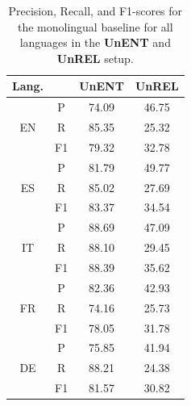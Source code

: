 \begin{table}[ht!]
\fontsize{10}{10}\selectfont
  \centering
    \begin{tabular}{c|c|c|c}
    \toprule
    {Lang.} & & {UnENT} & {UnREL} \\

     \midrule
     
     \multirow{3}{*}{EN} & P  &    74.09            & 46.75 \\
                         & R  &    85.35            & 25.32 \\
                         & F1 &    79.32            & 32.78 \\

     \midrule
     \multirow{3}{*}{ES} & P  &    81.79            & 49.77 \\
                         & R  &    {85.02}          & 27.69 \\
                         & F1 &    83.37            & 34.54 \\

     \midrule
     \multirow{3}{*}{IT} & P  &    {88.69}   & 47.09 \\
                         & R  &    {88.10}   & 29.45 \\
                         & F1 &    {88.39}   & 35.62 \\

     \midrule
     \multirow{3}{*}{FR} & P  &    82.36            & 42.93 \\
                         & R  &    74.16            & 25.73 \\
                         & F1 &    78.05            & 31.78 \\

     \midrule
     \multirow{3}{*}{DE} & P  &    {75.85}   & 41.94 \\
                         & R  &    {88.21}   & 24.38 \\
                         & F1 &    {81.57}   & 30.82 \\

    \bottomrule
    \end{tabular}
      \caption{Precision, Recall, and F1-scores for the monolingual baseline for all languages in the \textbf{UnENT} and \textbf{UnREL} setup.}
  \label{table:baseline}
\end{table}



